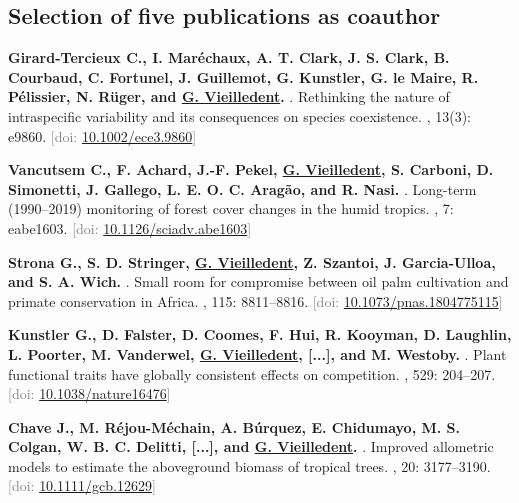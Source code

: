 \documentclass[10pt,a4paper,sans]{moderncv}
\newcounter{enumiv_gv}
\newcommand\doi[1]{[doi: \href{https://doi.org/#1}{#1}]}
\begin{document}
\vspace{0.3cm}
\subsection{Selection of five publications as coauthor}

\begin{thebibliography}{5}

\setcounter{enumiv}{4}
\textbf{Girard-Tercieux C., I. Maréchaux, A. T. Clark, J. S. Clark, B. Courbaud, C. Fortunel, J. Guillemot, G. Kunstler, G. le Maire, R. Pélissier, N. Rüger, and \underline{G. Vieilledent}.}
.
\newblock Rethinking the nature of intraspecific variability and its consequences on species coexistence.
, 13(3): e9860.
\newblock \textcolor{gray}{\doi{10.1002/ece3.9860}}
  
\setcounter{enumiv}{3}
\textbf{Vancutsem C., F. Achard, J.-F. Pekel, \underline{G. Vieilledent}, S. Carboni, D. Simonetti, J. Gallego, L. E. O. C. Aragão, and R. Nasi.}
.
\newblock Long-term (1990--2019) monitoring of forest cover changes in the humid tropics.
, 7: eabe1603.
\newblock \textcolor{gray}{\doi{10.1126/sciadv.abe1603}}

\setcounter{enumiv}{2}
\textbf{Strona G., S. D. Stringer, \underline{G. Vieilledent}, Z. Szantoi, J. Garcia-Ulloa, and S. A. Wich.}
.
\newblock Small room for compromise between oil palm cultivation and primate conservation in Africa.
, 115: 8811--8816.
\newblock \textcolor{gray}{\doi{10.1073/pnas.1804775115}}

\setcounter{enumiv}{1}
\textbf{Kunstler G., D. Falster, D. Coomes, F. Hui, R. Kooyman, D. Laughlin, L. Poorter, M. Vanderwel, \underline{G. Vieilledent}, [...], and M. Westoby.} 
.
\newblock Plant functional traits have globally consistent effects on competition.
, 529: 204--207.
\newblock \textcolor{gray}{\doi{10.1038/nature16476}}

\setcounter{enumiv}{0}
\textbf{Chave J., M. Réjou-Méchain, A. Búrquez, E. Chidumayo, M. S. Colgan, W. B. C. Delitti, [...], and \underline{G. Vieilledent}.} 
.
\newblock Improved allometric models to estimate the aboveground biomass of tropical trees. 
, 20: 3177--3190.
\newblock \textcolor{gray}{\doi{10.1111/gcb.12629}}

\end{thebibliography}
\end{document}
